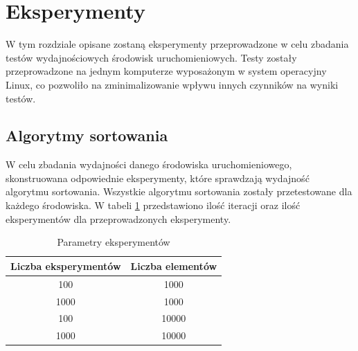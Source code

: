 \section{Eksperymenty}
W tym rozdziale opisane zostaną eksperymenty przeprowadzone w celu zbadania testów wydajnościowych środowisk uruchomieniowych. Testy zostały przeprowadzone na jednym komputerze wyposażonym w system operacyjny Linux, co pozwoliło na zminimalizowanie wpływu innych czynników na wyniki testów. 

\subsection{Algorytmy sortowania}
W celu zbadania wydajności danego środowiska uruchomieniowego, skonstruowana odpowiednie eksperymenty, które sprawdzają wydajność algorytmu sortowania. Wszystkie algorytmu sortowania zostały przetestowane dla każdego środowiska. W tabeli \ref{tab:sorting_experiments} przedstawiono ilość iteracji oraz ilość eksperymentów dla przeprowadzonych eksperymenty.

\begin{table}[H]
  \centering
  \begin{tabular}{|c|c|}
    \hline
    \textbf{Liczba eksperymentów} & \textbf{Liczba elementów} \\ \hline
    100 & 1000 \\ \hline
    1000 & 1000 \\ \hline
    100 & 10000 \\ \hline
    1000 & 10000 \\ \hline
  \end{tabular}
  \caption{Parametry eksperymentów}
  \label{tab:sorting_experiments}
\end{table}

